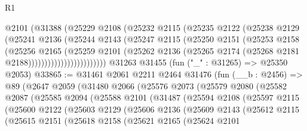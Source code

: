 \begin{lexlean}{R1}
\begin{coremodule}
                      @2101
                      (@31388
                        (@25229
                          @2108
                          (@25232
                            @2115
                            (@25235
                              @2122
                              (@25238
                                @2129
                                (@25241
                                  @2136
                                  (@25244
                                    @2143
                                    (@25247
                                      @2115
                                      (@25250
                                        @2151
                                        (@25253
                                          @2158
                                          (@25256
                                            @2165
                                            (@25259
                                              @2101
                                              (@25262
                                                @2136
                                                (@25265
                                                  @2174
                                                  (@25268 @2181 @2188))))))))))))))))))))))))
    @31263
    @31455
    (fun ("_" : @31265) => @25350 @2053)
@33865 := @31461
    @2061
    @2211
    @2464
    @31476
    (fun (__b : @2456) =>
    @89
      (@2647
        @2059
        (@31480
          @2066
          (@25576
            @2073
            (@25579
              @2080
              (@25582
                @2087
                (@25585
                  @2094
                  (@25588
                    @2101
                    (@31487
                      (@25594
                        @2108
                        (@25597
                          @2115
                          (@25600
                            @2122
                            (@25603
                              @2129
                              (@25606
                                @2136
                                (@25609
                                  @2143
                                  (@25612
                                    @2115
                                    (@25615
                                      @2151
                                      (@25618
                                        @2158
                                        (@25621
                                          @2165
                                          (@25624
                                            @2101

\end{coremodule}
\end{lexlean}
